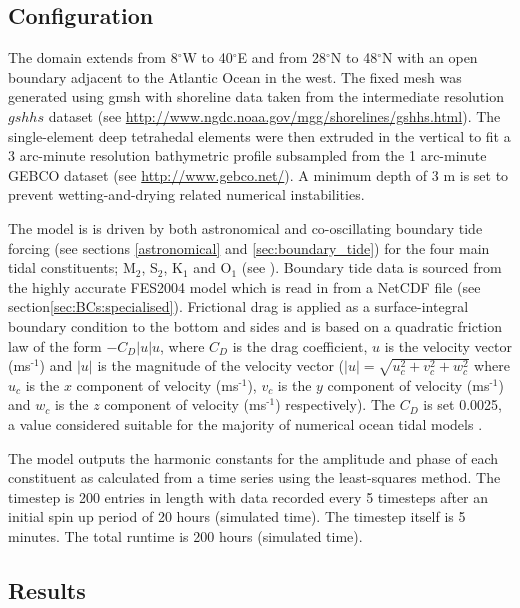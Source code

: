 \subsection{Configuration}

The domain extends from 8$^\circ$W to 40$^\circ$E and from 28$^\circ$N to 48$^\circ$N with an open boundary adjacent to the Atlantic
Ocean in the west. The fixed mesh was generated using gmsh with shoreline data taken from the intermediate resolution $gshhs$
dataset (see \url{http://www.ngdc.noaa.gov/mgg/shorelines/gshhs.html}). The single-element deep tetrahedal elements were then
extruded in the vertical to fit a 3 arc-minute resolution bathymetric profile subsampled from the 1 arc-minute GEBCO dataset
(see \url{http://www.gebco.net/}). A minimum depth of 3 m  is set to prevent wetting-and-drying related numerical instabilities.

The model is is driven by both astronomical and co-oscillating boundary tide forcing (see sections \ref{astronomical} and \ref{sec:boundary_tide})
for the four main tidal constituents; M$_{\text{2}}$, S$_{\text{2}}$, K$_{\text{1}}$ and O$_{\text{1}}$ (see \citealp{Schwiderski1980,Wells2008}).
Boundary tide data is sourced from the highly accurate FES2004 model \citep{Lyard2006} which is read in from a NetCDF file (see section\ref{sec:BCs:specialised}).
Frictional drag is applied as a surface-integral boundary condition to the bottom and sides and is based on a quadratic friction law
of the form $-C_{D}|u|u$, where $C_{D}$ is the drag coefficient, $u$ is the velocity vector
(ms$^{\text{-1}}$) and $|u|$ is the magnitude of the velocity vector ($|u|=\sqrt{u_{c}^{2}+v_{c}^{2}+w_{c}^{2}}$ where $u_{c}$ is the $x$ component of
velocity (ms$^{\text{-1}}$),
$v_{c}$ is the $y$ component of velocity (ms$^{\text{-1}}$) and $w_{c}$ is the
$z$ component of velocity (ms$^{\text{-1}}$) respectively).
The $C_{D}$ is set 0.0025, a value considered suitable for the majority of numerical ocean tidal models \citep{Wells2008}.

The model outputs the harmonic constants for the amplitude and phase of each constituent as calculated from a time series using the least-squares
method. The timestep is 200 entries in length with data recorded every 5 timesteps after an initial spin up period of 20 hours (simulated time).
The timestep itself is 5 minutes. The total runtime is 200 hours (simulated time).


\subsection{Results}

